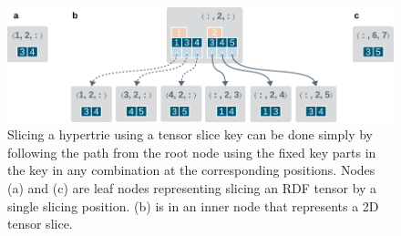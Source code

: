 \begin{figure}[h]
	\centering
	\includegraphics{figures/chapter2/hypertrie4_slices}
	\caption{Slicing a hypertrie using a tensor slice key can be done simply by following the path from the root node using the fixed key parts in the key in any combination at the corresponding positions. Nodes (a) and (c) are leaf nodes representing slicing an RDF tensor by a single slicing position. (b) is in an inner node that represents a 2D tensor slice.}
	\label{fig:rdf_hypertrie_slice}
\end{figure}
\clearpage